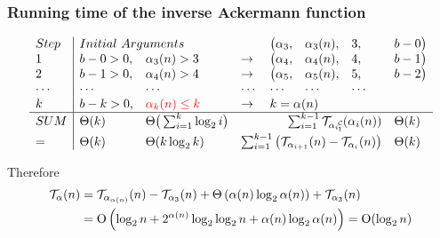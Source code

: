 \begin{frame}
\frametitle{Running time of the inverse Ackermann function}

\begin{equation*}
\begin{array}{l|llllllll}
Step & \multicolumn{2}{l}{Initial \ Arguments} &  &  \big(\alpha_3, & \alpha_3(n), & 3, & b - 0 \big) \\
1 & b - 0 > 0, & \alpha_3(n) > 3 & \to & \big(\alpha_4, & \alpha_4(n), & 4, & b - 1\big) \\
2 & b - 1 > 0, & \alpha_4(n) > 4 & \to  & \big(\alpha_5, & \alpha_5(n), & 5, & b - 2\big) \\
\cdots & \cdots &\cdots & \cdots & \cdots & \cdots & \cdots \\
k & b - k > 0, & {\color{red} \alpha_{k}(n) \le k} & \to  & \multicolumn{4}{l}{k = \alpha(n)} \\ \hline
SUM & \Theta(k) & \Theta\big(\sum_{i=1}^{k}\log_2i\big) & & \multicolumn{3}{r}{\sum_{i=1}^{k-1} \runtime_{\cdt{\alpha_i}{1}} (\alpha_i(n))} & \Theta(k) \\[3pt]
= & \Theta(k) & \Theta(k\log_2k) & \multicolumn{4}{r}{\sum_{i=1}^{k-1} \big(\runtime_{\alpha_{i+1}}(n) - \runtime_{\alpha_i}(n) \big)} & \Theta(k)
\end{array}
\end{equation*}

\smallskip

Therefore
\begin{equation*}
\begin{aligned}
\mathcal{T}_{\alpha}(n)
& = \mathcal{T}_{\alpha_{\alpha(n)}}(n) - \mathcal{T}_{\alpha_3}(n) + \Theta\left(\alpha(n)\log_2 \alpha(n)\right) + \mathcal{T}_{\alpha_3}(n) \\
& = \text{O} \left(\log_2n + 2^{\alpha(n)}\log_2\log_2n + \alpha(n)\log_2\alpha(n) \right) = \text{O} (\log_2n)
\end{aligned}
\end{equation*}

\end{frame}


